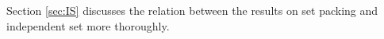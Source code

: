 Section \ref{sec:IS} discusses the relation between the results on set packing and independent set more thoroughly.

%

